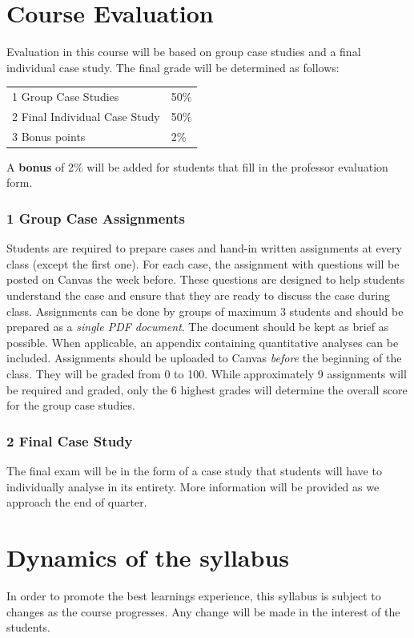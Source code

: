 \documentclass{article}
\begin{document}
\section*{Course Evaluation}

Evaluation in this course will be based on group case studies and a final individual case study.
The final grade will be determined as follows:

\vspace{.2in}
\begin{tabular}{p{2in}l}
1 Group Case Studies			&	50\% \\
2 Final Individual Case Study		&	50\% \\
3 Bonus points				&	2\%
\end{tabular}
\vspace{.2in}

A {\bf bonus} of 2\% will be added for students that fill in the professor evaluation form.

\subsubsection*{1 Group Case Assignments}
Students are required to prepare cases and hand-in written assignments at
every class (except the first one).
For each case, the assignment with questions will be posted on Canvas the week before.
These questions are designed to help students understand the case and ensure that
they are ready to discuss the case during class.
Assignments can be done by groups of maximum 3 students and should be
prepared as a \emph{single PDF document}. The document should be kept as brief
as possible. When applicable, an appendix containing quantitative analyses can be included.
Assignments should be uploaded to Canvas \emph{before} the beginning of the
class. They will be graded from 0 to 100. While approximately 9 assignments
will be required and graded, only the 6 highest grades will determine
the overall score for the group case studies.

\subsubsection*{2 Final Case Study}
The final exam will be in the form of a case study that students will have to
individually analyse in its entirety.
More information will be provided as we approach the end of quarter.

\section*{Dynamics of the syllabus}
In order to promote the best learnings experience, this syllabus is subject to
changes as the course progresses. Any change will be made in the interest of
the students.
\end{document}
